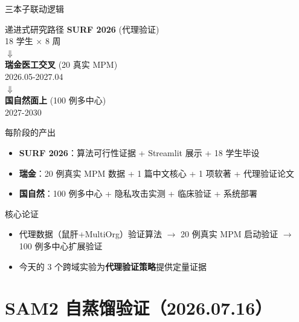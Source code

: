 \documentclass[aspectratio=169, 10pt]{beamer}
\begin{document}
\begin{frame}{三本子联动逻辑}
  \begin{block}{递进式研究路径}
    \centering
    \large
    \textcolor{myblue}{\textbf{SURF 2026}} (代理验证)\\[0.3em]
    \scriptsize 18 学生 $\times$ 8 周\\[0.8em]
    $\Downarrow$\\[0.5em]
    \textcolor{mygreen}{\textbf{瑞金医工交叉}} (20 真实 MPM)\\[0.3em]
    \scriptsize 2026.05-2027.04\\[0.8em]
    $\Downarrow$\\[0.5em]
    \textcolor{myorange}{\textbf{国自然面上}} (100 例多中心)\\[0.3em]
    \scriptsize 2027-2030
    \normalsize
  \end{block}
  \vspace{-0.3em}
  \begin{block}{每阶段的产出}
    \begin{itemize}
      \item \textbf{SURF 2026}：算法可行性证据 + Streamlit 展示 + 18 学生毕设
      \item \textbf{瑞金}：20 例真实 MPM 数据 + 1 篇中文核心 + 1 项软著 + 代理验证论文
      \item \textbf{国自然}：100 例多中心 + 隐私攻击实测 + 临床验证 + 系统部署
    \end{itemize}
  \end{block}
  \vspace{-0.3em}
  \begin{alertblock}{核心论证}
    \begin{itemize}
      \item 代理数据（鼠肝+MultiOrg）验证算法 $\to$ 20 例真实 MPM 启动验证 $\to$ 100 例多中心扩展验证
      \item 今天的 3 个跨域实验为\textbf{代理验证策略}提供定量证据
    \end{itemize}
  \end{alertblock}
\end{frame}

\section{SAM2 自蒸馏验证（2026.07.16）}
\end{document}
